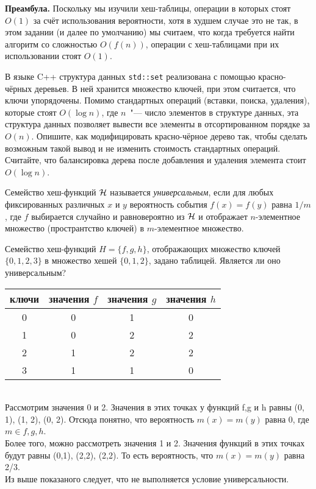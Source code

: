 \documentclass[12pt]{extreport}
\theoremstyle{definiton}
\theoremstyle{definition}
\theoremstyle{definition}
\def\H{{\cal H}}
\begin{document}
	
	 \noindent\textbf{Преамбула.} Поскольку мы изучили хеш-таблицы, операции в которых стоят $O(1)$ за счёт использования вероятности, хотя в худшем случае это не так, в этом задании (и далее по умолчанию) мы считаем, что когда требуется найти алгоритм со сложностью $O(f(n))$, операции с хеш-таблицами при их использовании стоят $O(1)$.

	 \Pr[3] В языке C++ структура данных \texttt{std::set} реализована с помощью красно-чёрных деревьев. В ней хранится множество ключей, при этом считается, что ключи упорядочены. Помимо стандартных операций (вставки, поиска, удаления), которые стоят $O(\log n)$, где $n$~"--- число элементов в структуре данных, эта структура данных позволяет вывести все элементы в отсортированном порядке за $O(n)$. Опишите, как модифицировать красно-чёрное дерево так, чтобы сделать возможным такой вывод и не изменить стоимость стандартных операций. Считайте, что балансировка дерева после добавления и удаления элемента стоит $O(\log n)$.

	 \medskip

	 Семейство хеш-функций $\H$ называется \emph{универсальным}, если для любых фиксированных различных $x$ и $y$ вероятность события $f(x)=f(y)$ равна $1/m$, где $f$ выбирается случайно и равновероятно из $\H$ и отображает $n$-элементное множество (пространтство ключей) в $m$-элементное множество.

	 \medskip


	 \Pr[2] Семейство хеш-функций $H = \{f,g,h\}$, отображающих множество ключей $\{0,1,2,3\}$ в множество хешей $\{0,1,2\}$, задано таблицей. Является ли оно универсальным?
     
	 \medskip


	 \begin{tabular}{|c|c|c|c|}
	 \hline
	 ключи&значения $f$&значения $g$&значения $h$\\
	 \hline
	 0&0&1&0\\
	 \hline
	 1&0&2&2\\
	 \hline
	 2&1&2&2\\
	 \hline
	 3&1&1&0\\
	 \hline
	 \end{tabular}
	 \newline 
     \\ Рассмотрим значения 0 и 2. Значения в этих точках у функций f,g и h равны (0, 1), (1, 2), (0, 2). Отсюда понятно, что вероятность $m(x)=m(y)$ равна 0, где $m \in {f,g,h}$.
     \\ Более того, можно рассмотреть значения 1 и 2. Значения функций в этих точках будут равны (0,1), (2,2), (2,2). То есть вероятность, что $m(x)=m(y)$ равна 2/3.
     \\ Из выше показаного следует, что не выполняется условие универсальности.
\end{document}

